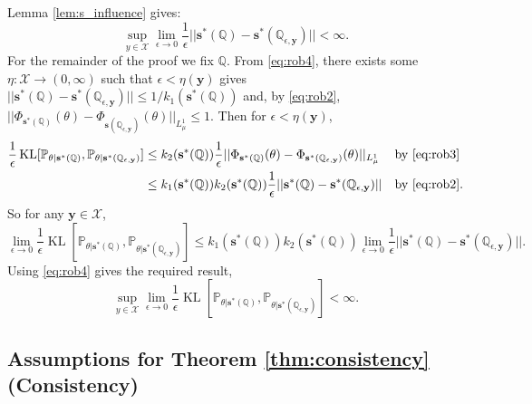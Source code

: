\documentclass{article}
\theoremstyle{plain}
\theoremstyle{definition}
\theoremstyle{remark}
\DeclareMathOperator{\KL}{KL}
\begin{document}
Lemma \ref{lem:s_influence} gives:
\begin{equation} \label{eq:rob4}
\sup_{y \in \mathcal{X}} \lim_{\epsilon \to 0} \frac{1}{\epsilon}
||\mathbf{s}^*(\mathbb{Q}) - \mathbf{s}^*(\mathbb{Q}_{\epsilon, \mathbf{y}})||
< \infty.
\end{equation}
For the remainder of the proof we fix $\mathbb{Q}$.
From \eqref{eq:rob4}, there exists some $\eta:\mathcal{X} \to (0,\infty)$
such that $\epsilon < \eta(\mathbf{y})$ gives
$||\mathbf{s}^*(\mathbb{Q}) - \mathbf{s}^*(\mathbb{Q}_{\epsilon, \mathbf{y}})|| \leq 1/k_1(\mathbf{s}^*(\mathbb{Q}))$
and, by \eqref{eq:rob2},
$||\Phi_{\mathbf{s}^*(\mathbb{Q})}(\theta) - \Phi_{\mathbf{s}(\mathbb{Q_{\epsilon, \mathbf{y}}})}(\theta)||_{L^1_\mu} \leq 1$.
Then for $\epsilon < \eta(\mathbf{y})$,
\begin{align*}
\frac{1}{\epsilon} \KL[
\mathbb{P}_{\theta|\mathbf{s}^*(\mathbb{Q})},
\mathbb{P}_{\theta|\mathbf{s}^*(\mathbb{Q}_{\epsilon, \mathbf{y}})}
]
&\leq k_2(\mathbf{s}^*(\mathbb{Q}))
\frac{1}{\epsilon} ||\Phi_{\mathbf{s}^*(\mathbb{Q})}(\theta) - \Phi_{\mathbf{s}^*(\mathbb{Q}_{\epsilon, \mathbf{y}})}(\theta)||_{L^1_\mu}
&& \text{by \eqref{eq:rob3}} \\
&\leq k_1(\mathbf{s}^*(\mathbb{Q})) k_2(\mathbf{s}^*(\mathbb{Q}))
\frac{1}{\epsilon} ||\mathbf{s}^*(\mathbb{Q}) - \mathbf{s}^*(\mathbb{Q}_{\epsilon, \mathbf{y}})||
&& \text{by \eqref{eq:rob2}}.
\end{align*}
So for any $\mathbf{y} \in \mathcal{X}$,
\begin{equation*}
\lim_{\epsilon \to 0} \frac{1}{\epsilon} \KL[
\mathbb{P}_{\theta|\mathbf{s}^*(\mathbb{Q})},
\mathbb{P}_{\theta|\mathbf{s}^*(\mathbb{Q}_{\epsilon, \mathbf{y}})}]
\leq k_1(\mathbf{s}^*(\mathbb{Q})) k_2(\mathbf{s}^*(\mathbb{Q}))
\lim_{\epsilon \to 0} \frac{1}{\epsilon} ||\mathbf{s}^*(\mathbb{Q}) - \mathbf{s}^*(\mathbb{Q}_{\epsilon, \mathbf{y}})||.
\end{equation*}
Using \eqref{eq:rob4} gives the required result,
\begin{equation*}
\sup_{y \in \mathcal{X}} \lim_{\epsilon \to 0} \frac{1}{\epsilon} \KL[
\mathbb{P}_{\theta|\mathbf{s}^*(\mathbb{Q})},
\mathbb{P}_{\theta|\mathbf{s}^*(\mathbb{Q}_{\epsilon, \mathbf{y}})}
] < \infty.
\end{equation*}

\subsection{Assumptions for Theorem \ref{thm:consistency} (Consistency)} \label{app:consistency assumptions}
\end{document}
